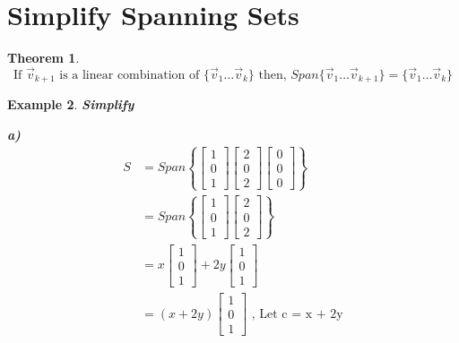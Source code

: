 \documentclass{article}
\newcounter{lecnum}
\newtheorem{theorem}{Theorem}[lecnum]
\newtheorem{ex}[theorem]{Example}
\begin{document}
\section{Simplify Spanning Sets}
\begin{theorem}
\[ \text{If } \vec{v}_{k+1} \text{ is a linear combination of } \{\vec{v}_1\ldots \vec{v}_k\} \text{  then, } 
Span\{\vec{v}_1\ldots \vec{v}_{k+1} \}  = \{\vec{v}_1\ldots \vec{v}_k\} \]
\end{theorem}

\newpage

\begin{ex}
\textbf{Simplify}\\


\begin{minipage}{.5\textwidth} %
\textbf{a)}
\[\begin{aligned} S & = Span\left\{ \begin{bmatrix} 1 \\ 0 \\ 1 \end{bmatrix} \begin{bmatrix} 2 \\ 0 \\ 2 \end{bmatrix} \begin{bmatrix} 0 \\ 0 \\ 0 \end{bmatrix} \right\} \\ 
& =  Span\left\{ \begin{bmatrix} 1 \\ 0 \\ 1 \end{bmatrix} \begin{bmatrix} 2 \\ 0 \\ 2 \end{bmatrix} \right\} \\ 
& = x \begin{bmatrix} 1 \\ 0 \\ 1 \end{bmatrix} + 2y \begin{bmatrix} 1 \\ 0 \\ 1 \end{bmatrix} \\
& = (x + 2y)\begin{bmatrix} 1 \\ 0 \\ 1 \end{bmatrix} \text{ , Let c = x + 2y} \\

\end{aligned}\]
\end{minipage}
\end{ex}
\end{document}
